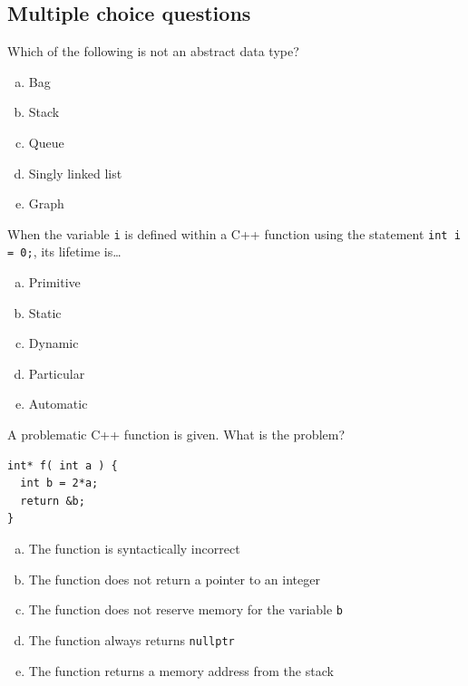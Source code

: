 \documentclass[addpoints]{exam}
\begin{document}
\begin{questions}

	\section{Multiple choice questions}

	\question[3]

	Which of the following is not an abstract data type?

	\begin{enumerate}[a)]
		\item Bag
		\item Stack
		\item Queue
        \item Singly linked list
        \item Graph
	\end{enumerate}

	\question[3]

	When the variable \texttt{i} is defined within a C++ function using the statement \texttt{int i = 0;}, its lifetime is\ldots

	\begin{enumerate}[a)]
		\item Primitive
		\item Static
		\item Dynamic
		\item Particular
		\item Automatic
	\end{enumerate}

	\question[3]

	A problematic C++ function is given. What is the problem?

	\begin{verbatim}
int* f( int a ) {
  int b = 2*a;
  return &b;
}
	\end{verbatim}
	
	\begin{enumerate}[a)]
		\item The function is syntactically incorrect
		\item The function does not return a pointer to an integer
		\item The function does not reserve memory for the variable \texttt{b}
		\item The function always returns \texttt{nullptr}
		\item The function returns a memory address from the stack
	\end{enumerate}


\end{questions}
\end{document}
